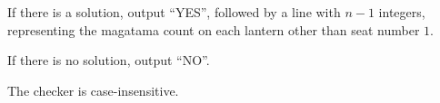 If there is a solution, output ``YES'', followed by a line with $n - 1$ integers, representing the magatama count on each lantern other than seat number $1$.

If there is no solution, output ``NO''.

The checker is case-insensitive.